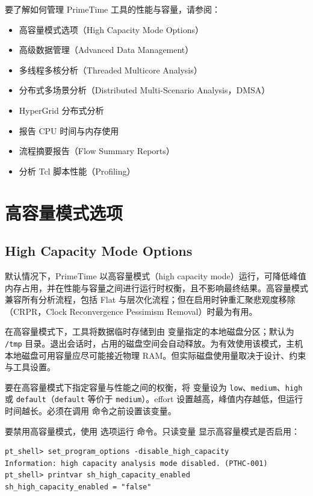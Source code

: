 \label{chap:perf}

要了解如何管理 PrimeTime 工具的性能与容量，请参阅：
\begin{itemize}
  \item 高容量模式选项（High Capacity Mode Options）
  \item 高级数据管理（Advanced Data Management）
  \item 多线程多核分析（Threaded Multicore Analysis）
  \item 分布式多场景分析（Distributed Multi-Scenario Analysis，DMSA）
  \item HyperGrid 分布式分析
  \item 报告 CPU 时间与内存使用
  \item 流程摘要报告（Flow Summary Reports）
  \item 分析 Tcl 脚本性能（Profiling）
\end{itemize}

\section{高容量模式选项}
\subsection*{High Capacity Mode Options}

默认情况下，PrimeTime 以高容量模式（high capacity mode）运行，可降低峰值内存占用，并在性能与容量之间进行运行时权衡，且不影响最终结果。高容量模式兼容所有分析流程，包括 Flat 与层次化流程；但在启用时钟重汇聚悲观度移除（CRPR，Clock Reconvergence Pessimism Removal）时最为有用。

在高容量模式下，工具将数据临时存储到由  变量指定的本地磁盘分区；默认为 \texttt{/tmp} 目录。退出会话时，占用的磁盘空间会自动释放。为有效使用该模式，主机本地磁盘可用容量应尽可能接近物理 RAM。但实际磁盘使用量取决于设计、约束与工具设置。

要在高容量模式下指定容量与性能之间的权衡，将  变量设为 \texttt{low}、\texttt{medium}、\texttt{high} 或 \texttt{default}（\texttt{default} 等价于 \texttt{medium}）。effort 设置越高，峰值内存越低，但运行时间越长。必须在调用  命令之前设置该变量。

要禁用高容量模式，使用  选项运行  命令。只读变量  显示高容量模式是否启用：
\begin{lstlisting}
pt_shell> set_program_options -disable_high_capacity
Information: high capacity analysis mode disabled. (PTHC-001)
pt_shell> printvar sh_high_capacity_enabled
sh_high_capacity_enabled = "false"
\end{lstlisting}


